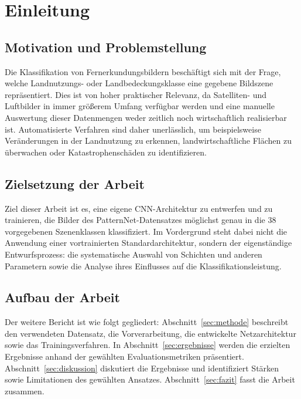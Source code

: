 \section{Einleitung}
\label{sec:einleitung}
 
\subsection{Motivation und Problemstellung}
\label{subsec:motivation}
 
Die Klassifikation von Fernerkundungsbildern beschäftigt sich mit der Frage, welche Landnutzungs- oder Landbedeckungsklasse eine gegebene Bildszene repräsentiert.
Dies ist von hoher praktischer Relevanz, da Satelliten- und Luftbilder in immer größerem Umfang verfügbar werden und eine manuelle Auswertung dieser Datenmengen weder zeitlich noch wirtschaftlich realisierbar ist.
Automatisierte Verfahren sind daher unerlässlich, um beispielsweise Veränderungen in der Landnutzung zu erkennen, landwirtschaftliche Flächen zu überwachen oder Katastrophenschäden zu identifizieren.
 
\subsection{Zielsetzung der Arbeit}
\label{subsec:zielsetzung}
 
Ziel dieser Arbeit ist es, eine eigene CNN-Architektur zu entwerfen und zu trainieren, die Bilder des PatternNet-Datensatzes möglichst genau in die 38 vorgegebenen Szenenklassen klassifiziert.
Im Vordergrund steht dabei nicht die Anwendung einer vortrainierten Standardarchitektur, sondern der eigenständige Entwurfsprozess: die systematische Auswahl von Schichten und anderen Parametern sowie die Analyse ihres Einflusses auf die Klassifikationsleistung.

\subsection{Aufbau der Arbeit}
\label{subsec:aufbau}
 
Der weitere Bericht ist wie folgt gegliedert:
Abschnitt~\ref{sec:methode} beschreibt den verwendeten Datensatz, die Vorverarbeitung, die entwickelte Netzarchitektur sowie das Trainingsverfahren.
	In Abschnitt~\ref{sec:ergebnisse} werden die erzielten Ergebnisse anhand der gewählten Evaluationsmetriken präsentiert.
	Abschnitt~\ref{sec:diskussion} diskutiert die Ergebnisse und identifiziert Stärken sowie Limitationen des gewählten Ansatzes.
	Abschnitt~\ref{sec:fazit} fasst die Arbeit zusammen.